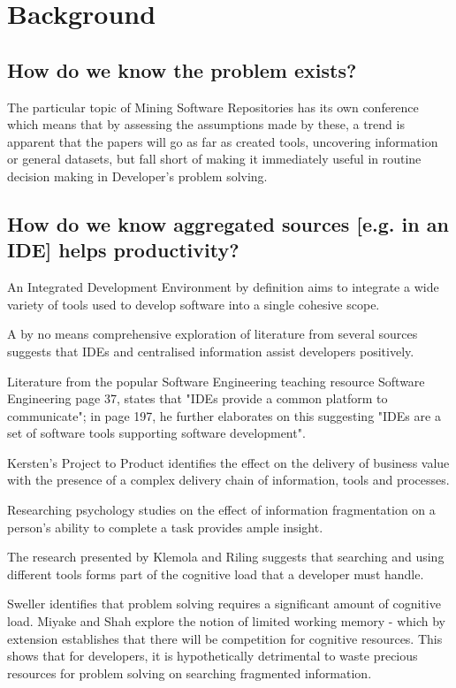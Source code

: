 \chapter{Background}
\section{How do we know the problem exists?}

The particular topic of Mining Software Repositories has its own conference \parencite{Storey:2019:3341883} which means that by assessing the assumptions made by these, a trend is apparent that the papers will go as far as created tools, uncovering information or general datasets, but fall short of making it immediately useful in routine decision making in Developer's problem solving.

\section{How do we know aggregated sources [e.g. in an IDE] helps productivity?}

An Integrated Development Environment by definition aims to integrate a wide variety of tools used to develop software into a single cohesive scope. 

A by no means comprehensive exploration of literature from several sources suggests that IDEs and centralised information assist developers positively. 

Literature from the popular Software Engineering teaching resource Software Engineering \parencite{Sommerville:2010:SE:1841764} page 37, states that "IDEs provide a common platform to communicate"; in page 197, he further elaborates on this suggesting "IDEs are a set of software tools supporting software development".

Kersten's Project to Product \parencite*{kersten2018projecproduct} identifies the effect on the delivery of business value with the presence of a complex delivery chain of information, tools and processes.

Researching psychology studies on the effect of information fragmentation on a person's ability to complete a task provides ample insight. 

The research presented by Klemola and Riling \parencite*{klemola2002modeling} suggests that searching and using different tools forms part of the cognitive load that a developer must handle.

Sweller \parencite*{sweller1998cognitive} identifies that problem solving requires a significant amount of cognitive load. Miyake and Shah \parencite*{miyake1999models} explore the notion of limited working memory - which by extension establishes that there will be competition for cognitive resources. This shows that for developers, it is hypothetically detrimental to waste precious resources for problem solving on searching fragmented information.


